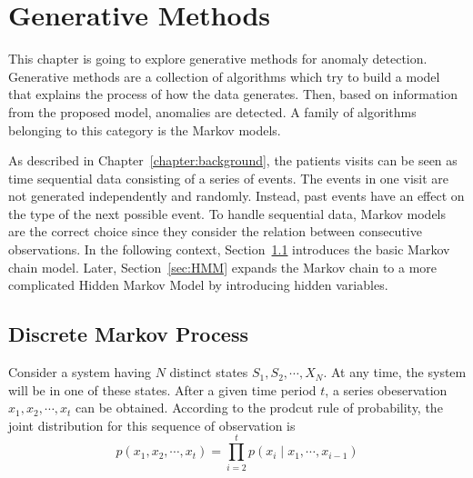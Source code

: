 \chapter{Generative Methods}
\label{chapter:generative}
This chapter is going to explore generative methods for anomaly detection. Generative methods are a collection of algorithms which try to build a model that explains the process of how the data generates. Then, based on information from the proposed model, anomalies are detected. A family of algorithms belonging to this category is the Markov models.

As described in Chapter~\ref{chapter:background}, the patients visits can be seen as time sequential data consisting of a series of events. The events in one visit are not generated independently and randomly. Instead, past events have an effect on the type of the next possible event. To handle sequential data, Markov models are the correct choice since they consider the relation between consecutive observations. In the following context, Section~\ref{sec:MM} introduces the basic Markov chain model. Later, Section~\ref{sec:HMM} expands the Markov chain to a more complicated Hidden Markov Model by introducing hidden variables.

\section{Discrete Markov Process}
\label{sec:MM}
Consider a system having \(N\) distinct states \(S_1, S_2, \cdots, X_N\). At any time, the system will be in one of these states. After a given time period \(t\), a series obeservation \(x_1, x_2, \cdots, x_t\) can be obtained. According to the prodcut rule of probability, the joint distribution for this sequence of observation is
\begin{equation}
	p(x_1, x_2, \cdots, x_t) = \prod_{i = 2}^{t} p(x_i \mid x_1, \cdots, x_{i-1})
\end{equation}

